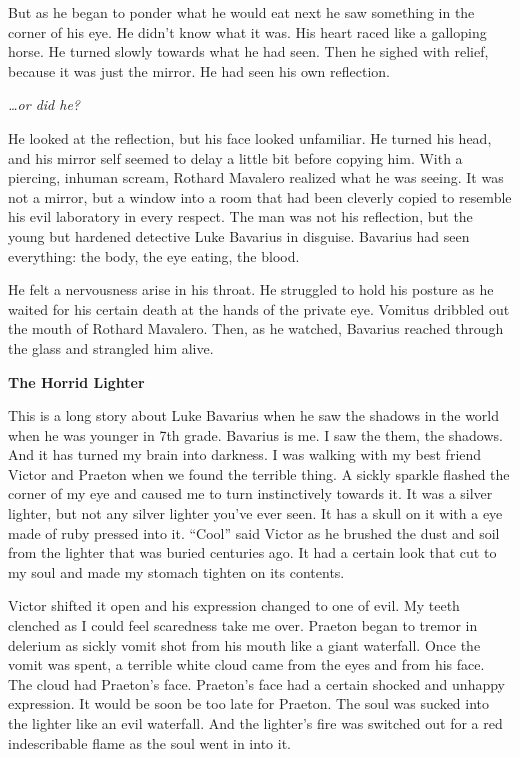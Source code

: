But as he began to ponder what he would eat next he saw something
in the corner of his eye. He didn't know what it was. His heart
raced like a galloping horse. He turned slowly towards what he had
seen. Then he sighed with relief, because it was just the mirror.
He had seen his own reflection.



{\em {\ldots}or did he?}



He looked at the reflection, but his face looked unfamiliar. He
turned his head, and his mirror self seemed to delay a little bit
before copying him. With a piercing, inhuman scream, Rothard
Mavalero realized what he was seeing. It was not a mirror, but a
window into a room that had been cleverly copied to resemble his
evil laboratory in every respect. The man was not his reflection,
but the young but hardened detective Luke Bavarius in disguise.
Bavarius had seen everything: the body, the eye eating, the
blood.



He felt a nervousness arise in his throat. He struggled to hold his
posture as he waited for his certain death at the hands of the
private eye. Vomitus dribbled out the mouth of Rothard Mavalero.
Then, as he watched, Bavarius reached through the glass and
strangled him alive. 
 





{\bf The Horrid Lighter}



This is a long story about Luke Bavarius when he saw the shadows in
the world when he was younger in 7th grade. Bavarius is me. I saw
the them, the shadows. And it has turned my brain into darkness. I
was walking with my best friend Victor and Praeton when we found
the terrible thing. A sickly sparkle flashed the corner of my eye
and caused me to turn instinctively towards it. It was a silver
lighter, but not any silver lighter you've ever seen. It has a
skull on it with a eye made of ruby pressed into it. ``Cool'' said
Victor as he brushed the dust and soil from the lighter that was
buried centuries ago. It had a certain look that cut to my soul and
made my stomach tighten on its contents.



Victor shifted it open and his expression changed to one of evil.
My teeth clenched as I could feel scaredness take me over. Praeton
began to tremor in delerium as sickly vomit shot from his mouth
like a giant waterfall. Once the vomit was spent, a terrible white
cloud came from the eyes and from his face. The cloud had Praeton's
face. Praeton's face had a certain shocked and unhappy expression.
It would be soon be too late for Praeton. The soul was sucked into
the lighter like an evil waterfall. And the lighter's fire was
switched out for a red indescribable flame as the soul went in into
it.



